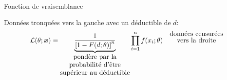 \documentclass[10pt, french]{article}
\begin{document}
\begin{multicols*}{2}
\begin{algo}{Fonction de vraisemblance}
\tcbline

Données tronquées vers la gauche avec un déductible de $d$:\\
\begin{align*}
	\mathcal{L}(\theta; \bm{x})
	&=	\underbrace{\frac{1}{\left[1	-	F(d; \theta)\right]^{n}}}_{\shortstack{pondère par la\\ probabilité d'être\\ supérieur au déductible}} \prod^{n}_{i	=	1} f(x_{i}; \theta)	&
	\shortstack{données censurées\\ vers la droite}	\\
\end{align*}
\end{algo}
\setlength{\mathindent}{1cm}

\end{multicols*}
\end{document}

